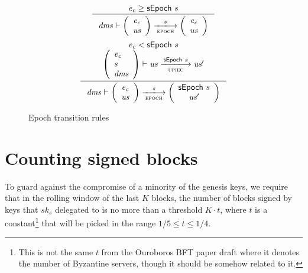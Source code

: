 \documentclass[11pt,a4paper]{article}
\newcommand{\var}[1]{\mathit{#1}}
\newcommand{\type}[1]{\mathsf{#1}}
\newcommand{\trans}[2]{\xlongrightarrow[\textsc{#1}]{#2}}
\begin{document}
\begin{figure}[ht]
  \begin{equation*}
    \inference
    {
      \var{e_c} \geq \sepoch{s}
    }
    {\var{dms} \vdash
      {
        \left(
        {\begin{array}{c}
          \var{e_c} \\
          \var{us}
         \end{array}
        }
        \right)
      }
      \trans{epoch}{s}
      {
        \left(
        {\begin{array}{c}
          \var{e_c} \\
          \var{us}
         \end{array}
        }
        \right)
      }
    }
  \end{equation*}
  \vspace{20pt}
  \begin{equation*}
    \inference
    {
      \var{e_c} < \sepoch{s}
      \\
      {\left(
          \begin{array}{l}
            \var{\var{e_c}} \\
            \var{s} \\
            \var{dms}
          \end{array}
        \right)
      }
      \vdash \var{us} \trans{upiec}{\sepoch{s}} \var{us'}
    }
    {
      \var{dms} \vdash
      {
        \left(
        {\begin{array}{c}
          \var{e_c} \\
          \var{us}
         \end{array}
        }
        \right)
      }
      \trans{epoch}{\var{s}}
      {
        \left(
        {\begin{array}{c}
          \sepoch{s} \\
          \var{us'}
         \end{array}
        }
        \right)
      }
    }
  \end{equation*}
  \caption{Epoch transition rules}
  \label{fig:rules:epoch}
\end{figure}

\clearpage
\section{Counting signed blocks}

\newcommand{\BSCEnv}{\type{BSCEnv}}
\newcommand{\BSCState}{\type{BSCState}}

To guard against the compromise of a minority of the genesis keys,
we require that in the rolling window of the last $K$ blocks, the number of
blocks signed by keys that $sk_s$ delegated to is no more than a threshold $K
\cdot t$, where $t$ is a constant\footnote{This is not the same $t$ from the
  Ouroboros BFT paper draft where it denotes the number of Byzantine servers,
  though it should be somehow related to it.} that will be picked in the range
$1/5 \leq t \leq 1/4$.
\end{document}
